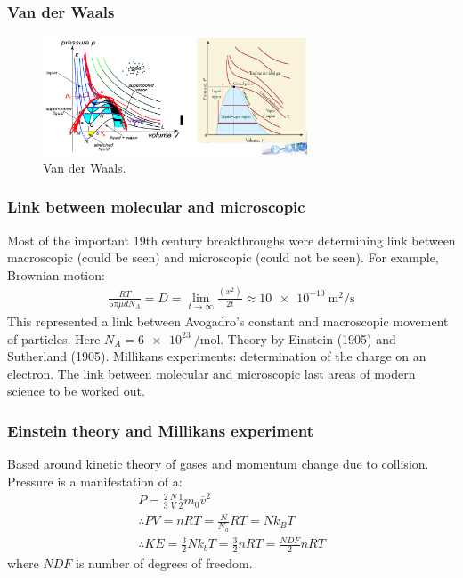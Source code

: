 \subsubsection{Van der Waals}
\begin{figure}[H]
	\centering
	\includegraphics[width = 0.7\textwidth]{./img/figure18.png}
	\caption{Van der Waals.}
\end{figure}
\subsubsection{Link between molecular and microscopic}
Most of the important 19th century breakthroughs were determining link between macroscopic (could be seen) and microscopic (could not be seen). For example, Brownian motion:
\begin{gather}
	\frac{RT}{5\pi\mu dN_A} = D = \lim_{t\rightarrow \infty} \frac{\left(x^2\right)}{2t} \approx \SI{10e-10}{\meter\squared\per\second}
\end{gather}
This represented a link between Avogadro's constant and macroscopic movement of particles. Here $N_A = \SI{6e23}{\per\mole}$. Theory by Einstein (1905) and Sutherland (1905). Millikans experiments: determination of the charge on an electron. The link between molecular and microscopic last areas of modern science to be worked out.
\subsubsection{Einstein theory and Millikans experiment}
Based around kinetic theory of gases and momentum change due to collision. Pressure is a manifestation of a:
\begin{gather}
	P = \frac{2}{3}\frac{N}{V}\frac{1}{2}m_0 \overline{v}^2\\
	\therefore PV = nRT = \frac{N}{N_a}RT = Nk_BT\\
	\therefore KE = \frac{3}{2}Nk_bT = \frac{3}{2}nRT = \frac{NDF}{2}nRT
\end{gather}
where $NDF$ is number of degrees of freedom.

